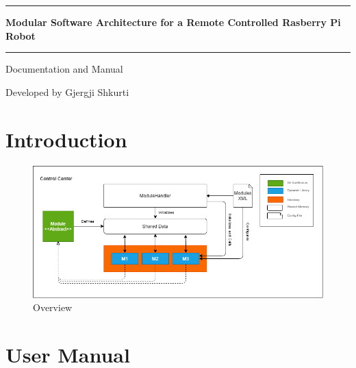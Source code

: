 \documentclass[12pt]{article}
\newcommand{\mytitle}{Modular Software Architecture for a Remote Controlled Rasberry Pi Robot}
\begin{document}

\begin{titlepage}
	\begin{center}
		\rule{\textwidth}{1.5pt}
		\LARGE
		\textbf{\mytitle}
		\rule{\textwidth}{1.5pt}

        \vspace{0.5cm}

        \LARGE
		Documentation and Manual

        \vspace{0.7cm}

		\large
		\date

		\texttt{[image: ../images/robot.png]}

		\vfill

		\normalsize
		Developed by Gjergji Shkurti

	\end{center}
\end{titlepage}

\newpage
\tableofcontents
\newpage

\listoffigures
\listoftables
\newpage


\section{Introduction}
\label{sec-intro}


\begin{figure}[tbh!]
	\centering
	\includegraphics[width=16cm]{../images/overview.png}
	\caption{Overview}
	\label{fig:overview}
\end{figure}

\section{User Manual}
\label{sec-user-manual}
\end{document}
